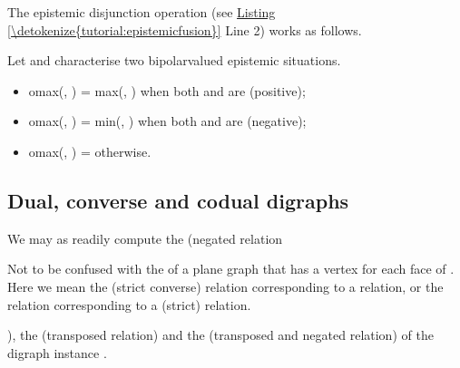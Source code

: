 \documentclass[a4paper,12pt,english]{sphinxhowto}
\begin{document}
The epistemic disjunction operation  (see \hyperref[\detokenize{tutorial:epistemicfusion}]{Listing \ref{\detokenize{tutorial:epistemicfusion}}} Line 2) works as follows.

Let  and  characterise two bipolar\sphinxhyphen{}valued epistemic situations.
\begin{itemize}
\item {} 
o\sphinxhyphen{}max(,  ) = max(,  ) when both  and  are  (positive);

\item {} 
o\sphinxhyphen{}max(,  ) = min(,  ) when both  and  are  (negative);

\item {} 
o\sphinxhyphen{}max(,  ) =  otherwise.

\end{itemize}


\subsection{Dual, converse and codual digraphs}
\label{\detokenize{tutorial:dual-converse-and-codual-digraphs}}\label{\detokenize{tutorial:codual-transform-label}}
We may as readily compute the  (negated relation %
\begin{footnote}[14]\sphinxAtStartFootnote
Not to be confused with the  of a plane graph  that has a vertex for each face of . Here we mean the  (strict converse) relation corresponding to a  relation, or the  relation corresponding to a (strict)  relation.
%
\end{footnote}), the  (transposed relation) and the  (transposed and negated relation) of the digraph instance .
\end{document}
